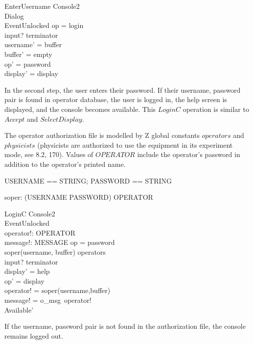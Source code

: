 \documentclass{article}
\begin{document}
\begin{schema}{EnterUsername}
	\Delta Console2 \\
	\Delta Dialog \\
	EventUnlocked
\where
	op = login \\
	input? \in terminator \\
	username' = buffer \\
	buffer' = empty \\
	op' = password \\
  	display' = display \\
\end{schema}
In the second step, the user enters their password.  If their
username, password pair is found in operator database, the user is
logged in, the help screen is displayed, and the console becomes
available.  This $LoginC$ operation is similar to $Accept$ and
$SelectDisplay$.

The operator authorization file is modelled by Z global constants
$operators$ and $physicists$ (physicists are authorized to use the
equipment in its experiment mode, see 8.2, 170).  Values of $OPERATOR$
include the operator's password in addition to the operator's printed
name.

\begin{zed} USERNAME == STRING; PASSWORD == STRING \end{zed}

\begin{axdef}
	soper: (USERNAME \cross PASSWORD) \fun OPERATOR \\
\end{axdef}

\begin{schema}{LoginC}
	\Delta Console2 \\
	EventUnlocked \\
	operator!: OPERATOR \\
	message!: MESSAGE
\where	
	op = password \\
	soper(username, buffer) \in operators \\
	input? \in terminator \\
	display' = help \\
	op' = display \\
	operator! = soper(username,buffer) \\
	message! = o\_msg~operator! \\
	Available'
\end{schema}
If the username, password pair is not found in the authorization file,
the console remains logged out.  
\end{document}
